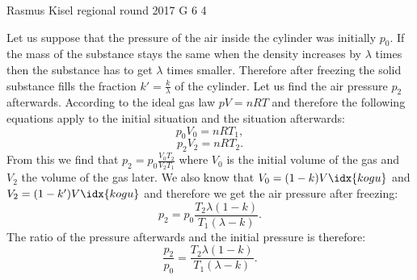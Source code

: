 \documentclass[11pt]{article}
\begin{document}
{Rasmus Kisel} %
{regional round} %
{2017} %
{G 6} %
{4} %
{

\ifEngSolution
Let us suppose that the pressure of the air inside the cylinder was initially $p_{0}$. If the mass of the substance stays the same when the density increases by $\lambda$ times then the substance has to get $\lambda$ times smaller. Therefore after freezing the solid substance fills the fraction $k'=\frac{k}{\lambda}$ of the cylinder. Let us find the air pressure $p_{2}$ afterwards. According to the ideal gas law $pV=nRT$ and therefore the following equations apply to the initial situation and the situation afterwards:
\begin{equation*}
p_{0}V_{0}=nRT_{1},
\end{equation*} 
\begin{equation*}
p_{2}V_{2}=nRT_{2}.
\end{equation*}
From this we find that $p_{2}=p_{0}\frac{V_{0}T_{2}}{V_{2}T_{1}}$ where $V_{0}$ is the initial volume of the gas and $V_{2}$ the volume of the gas later. We also know that $V_{0}=(1-k)V\idx{kogu}$ and $V_{2}=(1-k')V\idx{kogu}$ and therefore we get the air pressure after freezing:
\begin{equation*}
p_{2}=p_{0}\frac{T_{2}\lambda (1-k)}{T_{1}(\lambda-k)}.
\end{equation*} 
The ratio of the pressure afterwards and the initial pressure is therefore:
\begin{equation*}
\frac{p_{2}}{p_{0}}=\frac{T_{2}\lambda(1-k)}{T_{1}(\lambda-k)}.
\end{equation*}
\fi
}
\end{document}
